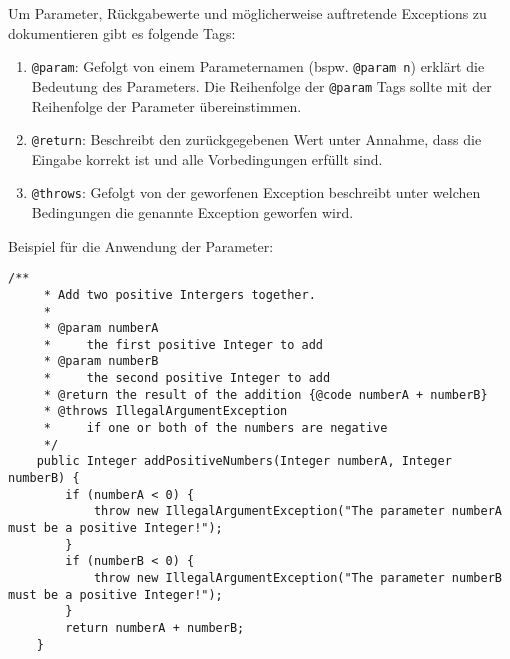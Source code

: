 \begin{Infobox}
    Um Parameter, Rückgabewerte und möglicherweise auftretende Exceptions zu dokumentieren gibt es folgende Tags:

    \begin{enumerate}[label=\roman*)]
        \item \lstinline{@param}: 
            Gefolgt von einem Parameternamen (bspw. \lstinline{@param n}) erklärt die Bedeutung des Parameters.
            Die Reihenfolge der \lstinline{@param} Tags sollte mit der Reihenfolge der Parameter übereinstimmen.
        \item \lstinline{@return}: 
            Beschreibt den zurückgegebenen Wert unter Annahme, dass die Eingabe korrekt ist und alle Vorbedingungen erfüllt sind.
        \item \lstinline{@throws}: 
            Gefolgt von der geworfenen Exception beschreibt unter welchen Bedingungen die genannte Exception geworfen wird.
    \end{enumerate}

    Beispiel für die Anwendung der Parameter:

    \begin{lstlisting}[numbers=none]
    /**
     * Add two positive Intergers together.
     * 
     * @param numberA
     *     the first positive Integer to add
     * @param numberB
     *     the second positive Integer to add
     * @return the result of the addition {@code numberA + numberB}
     * @throws IllegalArgumentException
     *     if one or both of the numbers are negative
     */
    public Integer addPositiveNumbers(Integer numberA, Integer numberB) {
        if (numberA < 0) {
            throw new IllegalArgumentException("The parameter numberA must be a positive Integer!");
        }
        if (numberB < 0) {
            throw new IllegalArgumentException("The parameter numberB must be a positive Integer!");
        }
        return numberA + numberB;
    }
    \end{lstlisting}
\end{Infobox}
